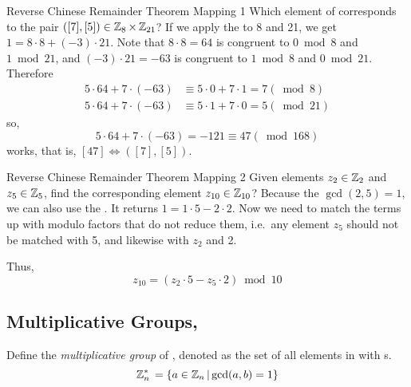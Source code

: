 \begin{example}[]{Reverse Chinese Remainder Theorem Mapping 1}
  Which element of  corresponds to the pair $([7],[5]) \in \operatorname{\mathbb{Z}}_{8} \times \operatorname{\mathbb{Z}}_{21}$?
  \tcblower{}
  If we apply the  to 8 and 21, we get $1 = 8 \cdot 8 + (-3) \cdot 21$.
  Note that $8 \cdot 8 = 64$ is congruent to $0 \bmod 8$ and $1 \bmod 21$, and $(-3) \cdot 21 = -63$ is congruent to $1 \bmod 8$ and $0 \bmod 21$.
  Therefore
  \begin{align*}
    5 \cdot 64+7 \cdot (-63) &\equiv 5 \cdot 0+7 \cdot 1 = 7 (\bmod 8) \\
    5 \cdot 64+7 \cdot (-63) &\equiv 5 \cdot 1+7 \cdot 0 = 5 (\bmod 21)
  \end{align*}
  so,
  \begin{equation*}
    5 \cdot 64 + 7 \cdot (-63) = -121 \equiv 47 (\bmod 168)
  \end{equation*}
  works, that is, $[47] \Leftrightarrow ([7],[5])$.
\end{example}

\begin{example}[]{Reverse Chinese Remainder Theorem Mapping 2}
  Given elements $z_{2} \in \operatorname{\mathbb{Z}}_{2}$ and $z_{5} \in \operatorname{\mathbb{Z}}_{5}$, find the corresponding element $z_{10} \in \operatorname{\mathbb{Z}}_{10}$?
  \tcblower{}
  Because the $\gcd(2, 5) = 1$, we can also use the .
  It returns $1 = 1 \cdot 5 - 2 \cdot 2$.
  Now we need to match the terms up with modulo factors that do not reduce them, i.e.\ any element $z_{5}$ should not be matched with 5, and likewise with $z_{2}$ and 2.

  Thus,
  \begin{equation*}
    z_{10} = (z_{2} \cdot 5 - z_{5} \cdot 2) \bmod 10
  \end{equation*}
\end{example}

\subsection{\texorpdfstring{Multiplicative Groups, \TextMultiplicativeGroupN{}}{Multiplicative Groups}}\label{Multiplicative_Groups}
\begin{definition}\label{def:Multiplicative_Group}
  Define the \emph{multiplicative group} of \TextIntsModN{}, denoted \TextMultiplicativeGroupN{} as the set of all elements in \TextIntsModN{} with s.
  \begin{equation}\label{eq:Multiplicative_Group}
    \operatorname{\mathbb{Z}}_{n}^{*}{} = \lbrace a \in \operatorname{\mathbb{Z}}_{n}{} \vert \gcd(a, b) = 1 \rbrace
  \end{equation}
\end{definition}

